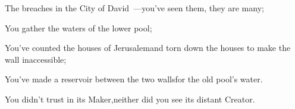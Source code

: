 
\begin{inparaenum}
  
  \pa {} The breaches in the City of David~---\pa you've seen them, they are many;%
  
  \pb You gather the waters of the lower pool;%
  
  \pa {} You've counted the houses of Jerusalem\pa and torn down the houses to make the wall inaccessible;%
  
  \pa {} You've made a reservoir between the two walls\pa for the old pool's water.%
  
  \pb You didn't trust in its Maker,\pa neither did you see its distant Creator.%
  
\end{inparaenum}
